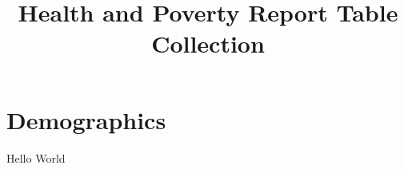 \documentclass[]{article}
\title{Health and Poverty Report Table Collection}
\author{}
\begin{document}
\maketitle 
\section {Demographics}
Hello World









































\end{document}
